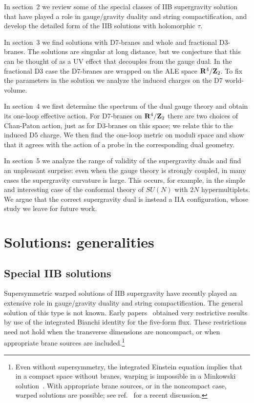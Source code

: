 \documentclass[a4paper,12pt]{article}
\renewcommand{\=}[1]{\bar{#1}}
\newcommand{\sect}[1]{\section{#1}\setcounter{equation}{0}}
\begin{document}
In section~2 we review some of the special classes of 
IIB supergravity solution that have played a role in gauge/gravity 
duality and string compactification, and
develop the detailed form of the IIB solutions 
with holomorphic $\tau$. 

In section~3 we find solutions with D7-branes and whole and
fractional D3-branes.  The solutions are singular at long distance, 
but we conjecture that this can be thought of as a UV effect that decouples from
the gauge dual.  In the fractional D3 case the D7-branes are wrapped
on the ALE space ${\bf R}^4/{\bf Z}_2$.  To fix the parameters in the solution we
analyze the induced charges on the D7 world-volume.

In section~4 we first determine the spectrum of the dual
gauge theory and obtain its one-loop effective action.  For D7-branes on ${\bf
R}^4/{\bf Z}_2$ there are two choices of Chan-Paton action, just as for D3-branes
on this space; we relate this to the induced D5 charge.  We then find the
one-loop metric on moduli space and show that it agrees with the action of a
probe in the corresponding dual geometry.

In section~5 we analyze the range of validity of the supergravity duals and find
an unpleasant surprise: even when the gauge theory is strongly coupled, in many
cases the supergravity curvature is large.  This occurs, for example, in the
simple and interesting case of the conformal theory of $SU(N)$ with $2N$
hypermultiplets.  We argue that the correct supergravity dual is instead a IIA
configuration, whose study we leave for future work.


\sect{Solutions: generalities}

\subsection{Special IIB solutions}

Supersymmetric warped solutions of IIB supergravity have recently played an
extensive role in gauge/gravity duality and string compactification.  The
general
solution of this type is not known.  Early papers~\cite{early} obtained very
restrictive results by use of the integrated Bianchi identity for the five-form
flux.  These restrictions need not hold when the transverse dimensions are
noncompact, or when appropriate brane sources are included.\footnote
{Even without supersymmetry, the integrated Einstein equation implies that in a
compact space without branes, warping is impossible in a Minkowski
solution~\cite{hari,MN}.  With appropriate brane sources, or in the
noncompact case, warped solutions are possible; see ref.~\cite{us} for a recent
discussion.}
\end{document}
